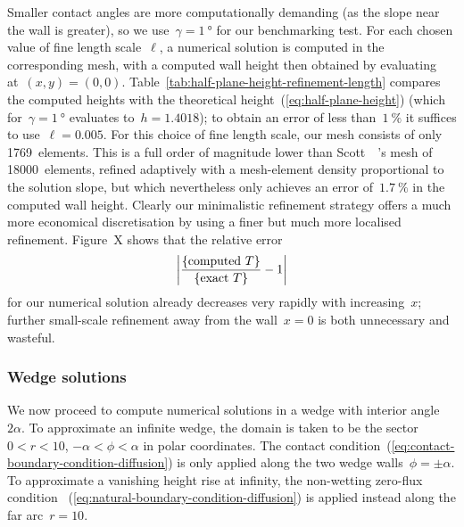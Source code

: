 Smaller contact angles are more computationally demanding
(as the slope near the wall is greater),
so we use~$\gamma = \SI{1}{\degree}$ for our benchmarking test.
For each chosen value of fine length scale~$\ell$,
a numerical solution is computed in the corresponding mesh,
with a computed wall height then obtained
by evaluating at~$(x, y) = (0, 0)$.
Table~\ref{tab:half-plane-height-refinement-length}
compares the computed heights
with the theoretical height~(\ref{eq:half-plane-height})
(which for~$\gamma = \SI{1}{\degree}$ evaluates to~$h = 1.4018$);
to obtain an error of less than~$\SI{1}{\percent}$
it suffices to use~$\ell = 0.005$.
For this choice of fine length scale,
our mesh consists of only 1769~elements.
This is a full order of magnitude lower than
Scott~\etal~\cite{scott-2005-computation-capillary-laplace-young}'s
mesh of 18000~elements, refined adaptively
with a mesh-element density proportional to the solution slope,
but which nevertheless only achieves an error of~$\SI{1.7}{\percent}$
in the computed wall height.
Clearly our minimalistic refinement strategy
offers a much more economical discretisation
by using a finer but much more localised refinement.
Figure~X %
shows that the relative error
\begin{equation}
  \abs*{\frac{\textq{computed~$T$}}{\textq{exact~$T$}} - 1}
\end{equation}
for our numerical solution already decreases very rapidly
with increasing~$x$;
further small-scale refinement away from the wall~$x = 0$
is both unnecessary and wasteful.

\subsubsection{Wedge solutions}
\label{sec:moderate.nonlinear.numerical.wedge}

We now proceed to compute numerical solutions
in a wedge with interior angle~$2 \alpha$.
To approximate an infinite wedge,
the domain is taken to be the sector
$0 < r < 10$, $-\alpha < \phi < \alpha$
in polar coordinates.
The contact condition~(\ref{eq:contact-boundary-condition-diffusion})
is only applied along the two wedge walls~$\phi = \pm \alpha$.
To approximate a vanishing height rise at infinity,
the non-wetting zero-flux condition~%
  (\ref{eq:natural-boundary-condition-diffusion})
is applied instead along the far arc~$r = 10$.

